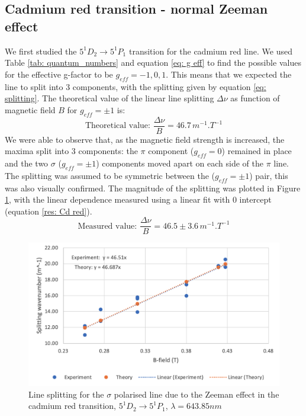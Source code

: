 \documentclass[11pt]{article}
\begin{document}
\subsection{Cadmium red transition - normal Zeeman effect} \label{sec: Cd red}
We first studied the $5^1 D_2\rightarrow 5^1 P_1$ transition for the cadmium red line. We used Table \ref{tab: quantum_numbers} and equation \eqref{eq: g eff} to find the possible values for the effective g-factor to be $g_{eff} = -1, 0, 1$. This means that we expected the line to split into 3 components, with the splitting given by equation \eqref{eq: splitting}. The theoretical value of the linear line splitting $\Delta \nu $ as function of magnetic field $B$ for $g_{eff} = \pm 1$ is: 
\begin{equation}
    \text{Theoretical value: } \frac{\Delta \nu}{B} = 46.7 \, \si{m^{-1}.T^{-1}}
\end{equation}
We were able to observe that, as the magnetic field strength is increased, the maxima split into 3 components: the $\pi$ component ($g_{eff} = 0$) remained in place and the two $\sigma$ ($g_{eff} = \pm 1$) components moved apart on each side of the $\pi$ line. The splitting was assumed to be symmetric between the ($g_{eff} = \pm 1$) pair, this was also visually confirmed. The magnitude of the splitting was plotted in Figure \ref{fig: Cd red}, with the linear dependence measured using a linear fit with $0$ intercept (equation \eqref{res: Cd red}). 
\begin{equation}
    \text{Measured value: } \frac{\Delta \nu}{B} = 46.5 \pm 3.6 \, \si{m^{-1}.T^{-1}}
    \label{res: Cd red}
\end{equation}
\begin{figure}
    \centering
    \includegraphics[width=0.6\linewidth]{Cd red.png}
    \caption{Line splitting for the $\sigma$ polarised line due to the Zeeman effect in the cadmium red transition, $5^1 D_2\rightarrow 5^1 P_1$, $\lambda = 643.85\si{nm}$}
    \label{fig: Cd red}
\end{figure}
\end{document}
